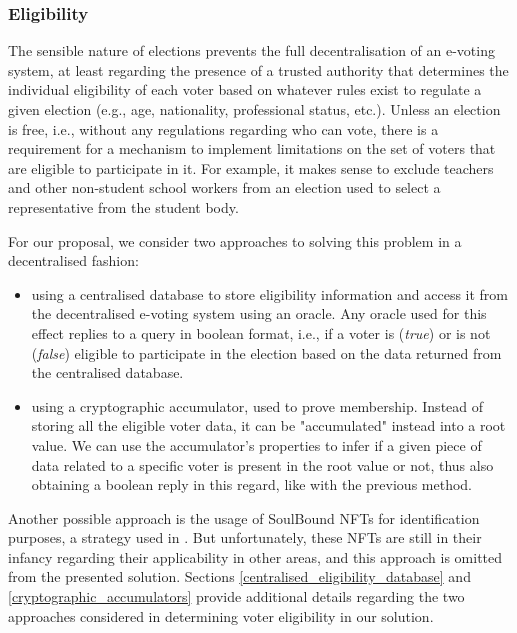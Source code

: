 \documentclass[../main.tex]{subfiles}
\begin{document}
        \subsubsection{Eligibility}
        \label{voter_eligibility}
            The sensible nature of elections prevents the full decentralisation of an e-voting system, at least regarding the presence of a trusted authority that determines the individual eligibility of each voter based on whatever rules exist to regulate a given election (e.g., age, nationality, professional status, etc.). Unless an election is free, i.e., without any regulations regarding who can vote, there is a requirement for a mechanism to implement limitations on the set of voters that are eligible to participate in it. For example, it makes sense to exclude teachers and other non-student school workers from an election used to select a representative from the student body.
            \par
            For our proposal, we consider two approaches to solving this problem in a decentralised fashion:
            \begin{itemize}
                \item{using a centralised database to store eligibility information and access it from the decentralised e-voting system using an oracle. Any oracle used for this effect replies to a query in boolean format, i.e., if a voter is (\textit{true})} or is not (\textit{false}) eligible to participate in the election based on the data returned from the centralised database.
                \item{using a cryptographic accumulator, used to prove membership. Instead of storing all the eligible voter data, it can be "accumulated" instead into a root value. We can use the accumulator's properties to infer if a given piece of data related to a specific voter is present in the root value or not, thus also obtaining a boolean reply in this regard, like with the previous method.}
            \end{itemize} 
            Another possible approach is the usage of SoulBound NFTs for identification purposes, a strategy used in \cite{Sagar2023}. But unfortunately, these NFTs are still in their infancy regarding their applicability in other areas, and this approach is omitted from the presented solution.
            Sections \ref{centralised_eligibility_database} and \ref{cryptographic_accumulators} provide additional details regarding the two approaches considered in determining voter eligibility in our solution.
\end{document}
